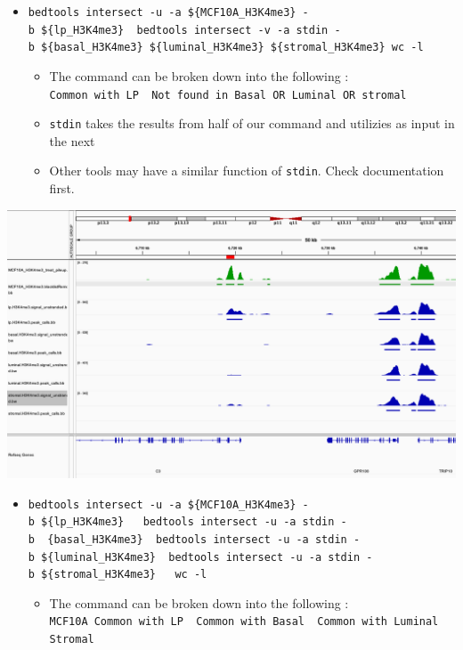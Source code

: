 \documentclass[
]{book}
\providecommand{\tightlist}{%
  \setlength{\itemsep}{0pt}\setlength{\parskip}{0pt}}
\begin{document}
\begin{itemize}
\tightlist
\item
  \texttt{bedtools\ intersect\ -u\ -a\ \$\{MCF10A\_H3K4me3\}\ -b\ \$\{lp\_H3K4me3\}\ \textbar{}\ bedtools\ intersect\ -v\ -a\ stdin\ -b\ \$\{basal\_H3K4me3\}\ \$\{luminal\_H3K4me3\}\ \$\{stromal\_H3K4me3\}\textbar{}\ wc\ -l}

  \begin{itemize}
  \tightlist
  \item
    The command can be broken down into the following : \texttt{Common\ with\ LP\ \textbar{}\ Not\ found\ in\ Basal\ OR\ Luminal\ OR\ stromal}
  \item
    \texttt{stdin} takes the results from half of our command and utilizies as input in the next
  \item
    Other tools may have a similar function of \texttt{stdin}. Check documentation first.
  \end{itemize}
\end{itemize}

\includegraphics{./img/MCF10A-pLP-mBLS.png}

\begin{itemize}
\tightlist
\item
  \texttt{bedtools\ intersect\ -u\ -a\ \$\{MCF10A\_H3K4me3\}\ -b\ \$\{lp\_H3K4me3\}\ \textbar{}\ \ bedtools\ intersect\ -u\ -a\ stdin\ -b\ \ \{basal\_H3K4me3\}\ \textbar{}\ bedtools\ intersect\ -u\ -a\ stdin\ -b\ \$\{luminal\_H3K4me3\}\ \textbar{}\ bedtools\ intersect\ -u\ -a\ stdin\ -b\ \$\{stromal\_H3K4me3\}\ \ \textbar{}\ wc\ -l}

  \begin{itemize}
  \tightlist
  \item
    The command can be broken down into the following : \texttt{MCF10A\ Common\ with\ LP\ \textbar{}\ Common\ with\ Basal\ \textbar{}\ Common\ with\ Luminal\ \textbar{}\ Stromal}
  \end{itemize}
\end{itemize}
\end{document}
